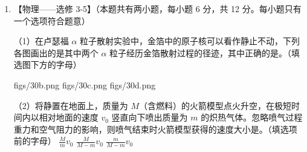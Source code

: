 \documentclass[\gkver]{gaokaozhenti}
\begin{document}
\begin{enumerate}
\item
【物理——选修 3-5】（本题共有两小题，每小题 6 分，共 12 分。每小题只有一个选项符合题意）

（1）在卢瑟福 $\alpha$ 粒子散射实验中，金箔中的原子核可以看作静止不动，下列各图画出的是其中两个 $\alpha$ 粒子经历金箔散射过程的径迹，其中正确的是。（填选图下方的字母）

{figs/30b.png}
{figs/30c.png}
{figs/30d.png}

（2）将静置在地面上，质量为 $M$（含燃料）的火箭模型点火升空，在极短时间内以相对地面的速度 $v_{0}$ 竖直向下喷出质量为 $m$ 的炽热气体。忽略喷气过程重力和空气阻力的影响，则喷气结束时火箭模型获得的速度大小是。（填选项前的字母）
{$\frac{M}{m}v_{0}$}
{$\frac{M}{M-m}v_{0}$}
{$\frac{m}{M-m}v_{0}$}

\end{enumerate}
\end{document}
